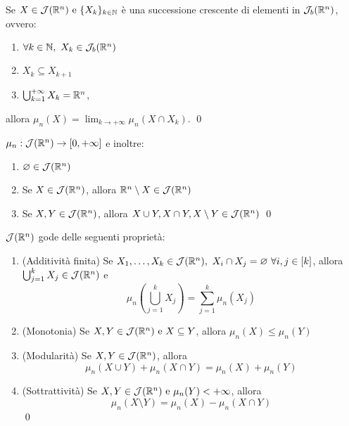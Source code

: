 \begin{theorem}
    Se $X \in \mathcal{J}(\mathbb{R}^n) \text{ e } \{X_k\}_{k \in \mathbb{N}}$ è una successione crescente di elementi in $\mathcal{J}_b(\mathbb{R}^n)$, ovvero:
    \begin{enumerate}
        \item $\forall k \in \mathbb{N}, \ X_k \in \mathcal{J}_b(\mathbb{R}^n)$
        \item $X_k \subseteq X_{k+1}$
        \item $\bigcup_{k=1}^{+\infty}X_k = \mathbb{R}^n$,
    \end{enumerate}
    allora $\mu_n(X)=\displaystyle\lim_{k\to + \infty}\mu_n(X\cap X_k)$.
    \qed
\end{theorem}

\begin{theorem}
    $\mu_n: \mathcal{J}(\mathbb{R}^n) \to [0, +\infty]$ e inoltre:
    \begin{enumerate}
        \item $\varnothing \in \mathcal{J}(\mathbb{R}^n)$
        \item Se $X \in \mathcal{J}(\mathbb{R}^n)$, allora $\mathbb{R}^n \setminus X \in \mathcal{J}(\mathbb{R}^n)$
        \item Se $X, Y \in \mathcal{J}(\mathbb{R}^n)$, allora $X \cup Y, X \cap Y, X \setminus Y \in \mathcal{J}(\mathbb{R}^n)$
        \qed
    \end{enumerate}
\end{theorem}

\begin{theorem}
    $\mathcal{J}(\mathbb{R}^n)$ gode delle seguenti proprietà:
    \begin{enumerate}
        \item (Additività finita) Se $X_1,\dots,X_k \in \mathcal{J}(\mathbb{R}^n), \ X_i \cap X_j = \varnothing \ \forall i, j \in [k]$, allora $\bigcup_{j=1}^kX_j \in \mathcal{J}(\mathbb{R}^n)$ e
        \begin{equation*}
            \mu_n\left(\bigcup_{j=1}^kX_j\right) = \sum_{j=1}^k\mu_n(X_j)
        \end{equation*}
        \item (Monotonia) Se $X, Y \in \mathcal{J}(\mathbb{R}^n) \text{ e } X \subseteq Y$, allora $\mu_n(X) \leq \mu_n(Y)$
        \item (Modularità) Se $X, Y \in \mathcal{J}(\mathbb{R}^n)$, allora
        \begin{equation*}
            \mu_n(X \cup Y) + \mu_n (X \cap Y) = \mu_n(X) + \mu_n(Y)
        \end{equation*}
        \item (Sottrattività) Se $X, Y \in \mathcal{J}(\mathbb{R}^n) \text{ e } \mu_n(Y) < + \infty$, allora
        \begin{equation*}
            \mu_n(X \setminus Y) = \mu_n(X) - \mu_n(X \cap Y)
        \end{equation*}
        \qed
    \end{enumerate}
\end{theorem}

